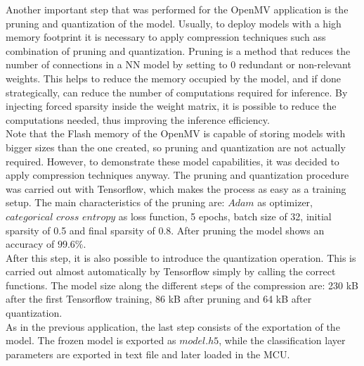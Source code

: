 \documentclass[12pt]{report}
\begin{document}
Another important step that was performed for the OpenMV application is the pruning and quantization of the model. Usually, to deploy models with a high memory footprint it is necessary to apply compression techniques such ass combination of pruning and quantization.
Pruning is a method that reduces the number of connections in a NN model by setting to 0 redundant or non-relevant weights. This helps to reduce the memory occupied by the model, and if done strategically, can reduce the number of computations required for inference. By injecting forced sparsity inside the weight matrix, it is possible to reduce the computations needed, thus improving the inference efficiency. \\
Note that the Flash memory of the OpenMV is capable of storing models with bigger sizes than the one created, so pruning and quantization are not actually required. However, to demonstrate these model capabilities, it was decided to apply compression techniques anyway. The pruning and quantization procedure was carried out with Tensorflow, which makes the process as easy as a training setup. The main characteristics of the pruning are: $Adam$ as optimizer, $categorical$ $cross$ $entropy$ as loss function, 5 epochs, batch size of 32, initial sparsity of 0.5 and final sparsity of 0.8. After pruning the model shows an accuracy of $99.6\%$.\\
After this step, it is also possible to introduce the quantization operation. This is carried out almost automatically by Tensorflow simply by calling the correct functions. The model size along the different steps of the compression are: 230 kB after the first Tensorflow training, 86 kB after pruning and 64 kB after quantization. \\
As in the previous application, the last step consists of the exportation of the model. The frozen model is exported as $model.h5$, while the classification layer parameters are exported in text file and later loaded in the MCU. 
\end{document}
